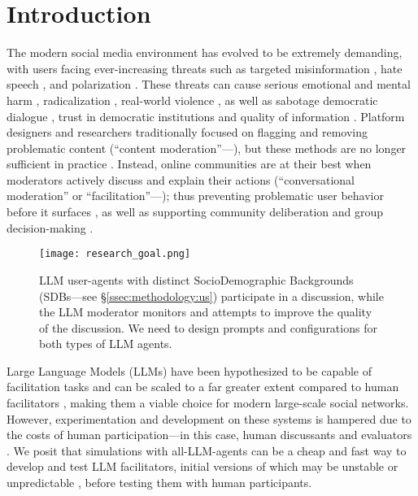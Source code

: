 %
\section{Introduction}
\label{sec:introduction}

The modern social media environment has evolved to be extremely demanding, with users facing ever-increasing threats such as targeted misinformation \cite{clemons2025disinformation, Denniss2025Social}, hate speech \cite{kolluri2025parler}, and polarization \cite{pranesh2024impactsocialmediapolarization}. These threats can cause serious emotional and mental harm \citep{proactive_moderation}, radicalization \citep{cho-etal-2024-language}, real-world violence \citep{schaffner_community_guidelines}, as well as sabotage democratic dialogue \citep{esau2017design, falk-etal-2021-predicting, seering_self_moderation}, trust in democratic institutions \citep{schroeder-etal-2024-fora} and quality of information \citep{make_reddit_great}. Platform designers and researchers traditionally focused on flagging and removing problematic content (``content moderation''---\citet{seering_self_moderation, cresci_pesonalized_interventions}), but these methods are no longer sufficient in practice \cite{horta_automated_moderation, schaffner_community_guidelines, small-polis-llm, korre2025evaluation}. Instead, online communities are at their best when moderators actively discuss and explain their actions (``conversational moderation'' or ``facilitation''---\citet{argyle2023, korre2025evaluation, falk-etal-2021-predicting}); thus preventing problematic user behavior before it surfaces \cite{cho-etal-2024-language, seering_self_moderation, cresci_pesonalized_interventions, make_reddit_great}, as well as supporting community deliberation and group decision-making \cite{kim_et_al_chatbot, seering_self_moderation}. 

\begin{figure}[t]
	\centering
	\texttt{[image: research\_goal.png]}
	\caption{LLM user-agents with distinct SocioDemographic Backgrounds (SDBs---see \S\ref{ssec:methodology:us}) participate in a discussion, while the LLM moderator monitors and attempts to improve the quality of the discussion. We need to design prompts and configurations for both types of LLM agents.}
	\label{fig::goals}
\end{figure}

Large Language Models (LLMs) have been hypothesized to be capable of facilitation tasks and can be scaled to a far greater extent compared to human facilitators \cite{korre2025evaluation, small-polis-llm}, making them a viable choice for modern large-scale social networks. However, experimentation and development on these systems is hampered due to the costs of human participation---in this case, human discussants and evaluators \citep{rossi_2024}. We posit that simulations with all-LLM-agents can be a cheap and fast way to develop and test LLM facilitators, initial versions of which may be unstable or unpredictable \cite{atil_2025, rossi_2024}, before testing them with human participants. 

